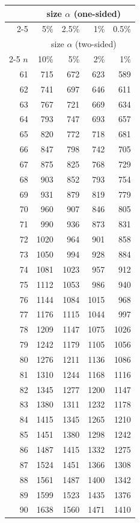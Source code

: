 \hfill
\begin{minipage}[t]{0.32\textwidth}
	\centering
	\begin{tabular}{rrrrr}
		& \multicolumn{4}{c}{size $\alpha$ (one-sided)} \\
		\cline{2-5}
		& 5\% & 2.5\% & 1\% & 0.5\% \\
		& \multicolumn{4}{c}{size $\alpha$ (two-sided)} \\
		\cline{2-5}
		$n$ & 10\% & 5\% & 2\% & 1\% \\
		\midrule
		61 & 715 & 672 & 623 & 589 \\
		62 & 741 & 697 & 646 & 611 \\
		63 & 767 & 721 & 669 & 634 \\
		64 & 793 & 747 & 693 & 657 \\
		65 & 820 & 772 & 718 & 681 \\
		66 & 847 & 798 & 742 & 705 \\
		67 & 875 & 825 & 768 & 729 \\
		68 & 903 & 852 & 793 & 754 \\
		69 & 931 & 879 & 819 & 779 \\
		70 & 960 & 907 & 846 & 805 \\[5pt]
		71 & 990 & 936 & 873 & 831 \\
		72 & 1020 & 964 & 901 & 858 \\
		73 & 1050 & 994 & 928 & 884 \\
		74 & 1081 & 1023 & 957 & 912 \\
		75 & 1112 & 1053 & 986 & 940 \\
		76 & 1144 & 1084 & 1015 & 968 \\
		77 & 1176 & 1115 & 1044 & 997 \\
		78 & 1209 & 1147 & 1075 & 1026 \\
		79 & 1242 & 1179 & 1105 & 1056 \\
		80 & 1276 & 1211 & 1136 & 1086 \\[5pt]
		81 & 1310 & 1244 & 1168 & 1116 \\
		82 & 1345 & 1277 & 1200 & 1147 \\
		83 & 1380 & 1311 & 1232 & 1178 \\
		84 & 1415 & 1345 & 1265 & 1210 \\
		85 & 1451 & 1380 & 1298 & 1242 \\
		86 & 1487 & 1415 & 1332 & 1275 \\
		87 & 1524 & 1451 & 1366 & 1308 \\
		88 & 1561 & 1487 & 1400 & 1342 \\
		89 & 1599 & 1523 & 1435 & 1376 \\
		90 & 1638 & 1560 & 1471 & 1410 \\
		\midrule
	\end{tabular}
\end{minipage}

